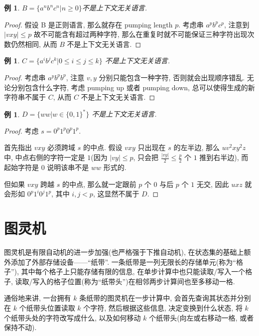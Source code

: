 \documentclass[8pt]{article}
\theoremstyle{compact}
\newtheorem{example}[theorem]{例}
\def\le{\leqslant}
\def\ge{\geqslant}
\begin{document}
\begin{example}
	$B = \{a^nb^nc^n | n \ge 0\}$不是上下文无关语言.
\end{example}
\begin{proof}
	假设 B 是正则语言, 那么就存在 pumping length $p$. 考虑串 $a^pb^pc^p$, 注意到 $|vxy| \le p$ 故不可能含有超过两种字符, 那么在重复时就不可能保证三种字符出现次数仍然相同, 从而 $B$ 不是上下文无关语言.
\end{proof}
\begin{example}
	$C = \{a^ib^jc^k | 0 \le i \le j \le k\}$ 不是上下文无关语言.
\end{example}
\begin{proof}
	考虑串 $a^{p}b^{p}b^{p}$, 注意 $v, y$ 分别只能包含一种字符, 否则就会出现顺序错乱. 无论分别包含什么字符, 考虑 pumping up 或者 pumping down, 总可以使得生成的新字符串不属于 $C$, 从而 $C$ 不是上下文无关语言.
\end{proof}
\begin{example}
	$D = \{ww | w \in \{0, 1\}^*\}$ 不是上下文无关语言. 
\end{example}
\begin{proof}
	考虑 $s = 0^p1^p0^p1^p$. 

	首先指出 $vxy$ 必须跨域 $s$ 的中点. 假设 $vxy$ 只出现在 $s$ 的左半边, 那么 $uv^2xy^2z$ 中, 中点右侧的字符一定是 $1$(因为 $|vy| \le p$, 只会把 $\frac{|vy|}{2} \le \frac p2$ 个 $1$ 推到右半边), 而起始字符是 $0$ 说明该串不是 $ww$ 形式的. 

	但如果 $vxy$ 跨越 $s$ 的中点, 那么就一定跟前 $p$ 个 $0$ 与后 $p$ 个 $1$ 无交, 因此 $uxz$ 就会形如 $0^p1^i0^j1^p$, 其中 $i, j < p$, 这显然不属于 $D$.
\end{proof}

\newpage
\section{图灵机}

图灵机是有限自动机的进一步加强(也严格强于下推自动机), 在状态集的基础上额外添加了外部存储设备——“纸带”. 一条纸带是一列无限长的存储单元(称为“格子”), 其中每个格子上只能存储有限的信息, 在单步计算中也只能读取/写入一个格子, 读取/写入的格子位置(称为“纸带头”)在相邻两步计算间也至多移动一格. 

通俗地来讲, 一台拥有 $k$ 条纸带的图灵机在一步计算中, 会首先查询其状态并分别在 $k$ 个纸带头位置读取 $k$ 个字符, 然后根据这些信息, 决定变换到什么状态, 将 $k$ 个纸带头处的字符改写成什么, 以及如何移动 $k$ 个纸带头(向左或右移动一格, 或者保持不动). 
\end{document}
